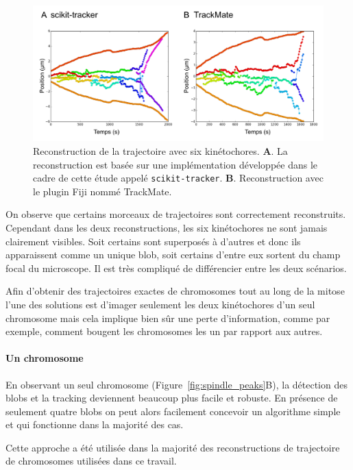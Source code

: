 \documentclass[12pt,a4paper,twoside,openright]{book}
\let\oldparagraph\paragraph
\renewcommand{\paragraph}[1]{\oldparagraph{#1}\mbox{}}
\begin{document}
\begin{figure}[htbp]
\centering
\includegraphics{figures/results/imaging/ndc80.png}
\caption{\label{fig:ndc80-reconstruction}Reconstruction de la
trajectoire avec six kinétochores. \textbf{A}. La reconstruction est
basée sur une implémentation développée dans le cadre de cette étude
appelé \texttt{scikit-tracker}. \textbf{B}. Reconstruction avec le
plugin Fiji nommé TrackMate.}
\end{figure}

On observe que certains morceaux de trajectoires sont correctement
reconstruits. Cependant dans les deux reconstructions, les six
kinétochores ne sont jamais clairement visibles. Soit certains sont
superposés à d'autres et donc ils apparaissent comme un unique blob,
soit certains d'entre eux sortent du champ focal du microscope. Il est
très compliqué de différencier entre les deux scénarios.

Afin d'obtenir des trajectoires exactes de chromosomes tout au long de
la mitose l'une des solutions est d'imager seulement les deux
kinétochores d'un seul chromosome mais cela implique bien sûr une perte
d'information, comme par exemple, comment bougent les chromosomes les un
par rapport aux autres.

\paragraph{Un chromosome}\label{un-chromosome}

En observant un seul chromosome (Figure~\ref{fig:spindle_peaks}B), la
détection des blobs et la tracking deviennent beaucoup plus facile et
robuste. En présence de seulement quatre blobs on peut alors facilement
concevoir un algorithme simple et qui fonctionne dans la majorité des
cas.

Cette approche a été utilisée dans la majorité des reconstructions de
trajectoire de chromosomes utilisées dans ce travail.
\end{document}
